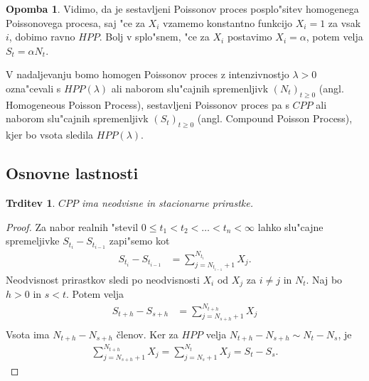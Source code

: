 \documentclass[12pt, a4paper, reqno]{amsart}
\theoremstyle{definition} %
\newtheorem{opomba}[definicija]{Opomba}
\theoremstyle{plain} %
\newtheorem{trditev}[definicija]{Trditev}
\newcommand{\1}{\mathds{1}}
\begin{document}
    \begin{opomba}
        Vidimo, da je sestavljeni Poissonov proces posplo"sitev homogenega Poissonovega procesa, saj "ce za
        $X_i$ vzamemo konstantno funkcijo $X_i = 1$ za vsak $i$, dobimo ravno $HPP$. Bolj v splo"snem, "ce za $X_i$ 
        postavimo $X_i = \alpha$, potem velja $S_t = \alpha N_t$.
        \label{op:CPPHPPPovezava}
    \end{opomba}

    V nadaljevanju bomo homogen Poissonov proces z intenzivnostjo $\lambda >0$ ozna"cevali s $HPP(\lambda)$ 
    ali naborom slu"cajnih spremenljivk $(N_t)_{t\geq0}$ (angl. Homogeneous Poisson Process), 
    sestavljeni Poissonov proces pa s $CPP$ ali naborom slu"cajnih spremenljivk $(S_t)_{t\geq0}$ 
    (angl. Compound Poisson Process), kjer bo vsota sledila $HPP(\lambda)$.

    \subsection{Osnovne lastnosti}

        \begin{trditev}
            $CPP$ ima neodvisne in stacionarne prirastke.
            \label{trd:neodvPrirCPP}
        \end{trditev}

        \begin{proof}
            Za nabor realnih "stevil $0 \leq t_1 < t_2 < \ldots < t_n < \infty$ lahko slu"cajne
            spremeljivke $S_{t_i} - S_{t_{i-1}}$ zapi"semo kot
            \begin{align*}
                S_{t_i} - S_{t_{i-1}} &= \sum_{j=N_{t_{i-1}}+1}^{N_{t_i}} X_j. 
            \end{align*}
            Neodvisnost prirastkov sledi po neodvisnosti $X_i$ od $X_j$ za $i\neq j$ in $N_t$. 
            Naj bo $h > 0$ in $s < t$. Potem velja
            \begin{align*}
                S_{t+h} - S_{s+h} &= \sum_{j=N_{s+h}+1}^{N_{t+h}} X_j \\
            \end{align*}
            Vsota ima $N_{t+h} - N_{s+h}$ členov. Ker za $HPP$ velja 
            $N_{t+h} - N_{s+h} \sim N_t - N_s$, je 
            \begin{align*}
                \sum_{j=N_{s+h}+1}^{N_{t+h}} X_j = \sum_{j=N_{s}+1}^{N_{t}} X_j = S_t - S_s.
            \end{align*}
        \end{proof}
\end{document}
